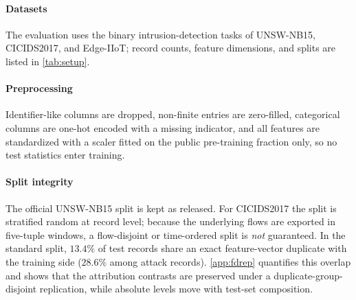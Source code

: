 \documentclass[a4paper,fleqn]{cas-dc}
\begin{document}
\paragraph{Datasets}
The evaluation uses the binary intrusion-detection tasks of UNSW-NB15, CICIDS2017, and Edge-IIoT; record counts, feature dimensions, and splits are listed in \cref{tab:setup}.
\par
\paragraph{Preprocessing}
Identifier-like columns are dropped, non-finite entries are zero-filled, categorical columns are one-hot encoded with a missing indicator, and all features are standardized with a scaler fitted on the public pre-training fraction only, so no test statistics enter training.
\par
\paragraph{Split integrity} The official UNSW-NB15 split is kept as released. For CICIDS2017 the split is stratified random at record level; because the underlying flows are exported in five-tuple windows, a flow-disjoint or time-ordered split is \emph{not} guaranteed. In the standard split, $13.4\%$ of test records share an exact feature-vector duplicate with the training side ($28.6\%$ among attack records). \cref{app:fdrep} quantifies this overlap and shows that the attribution contrasts are preserved under a duplicate-group-disjoint replication, while absolute levels move with test-set composition.
\par
\end{document}
